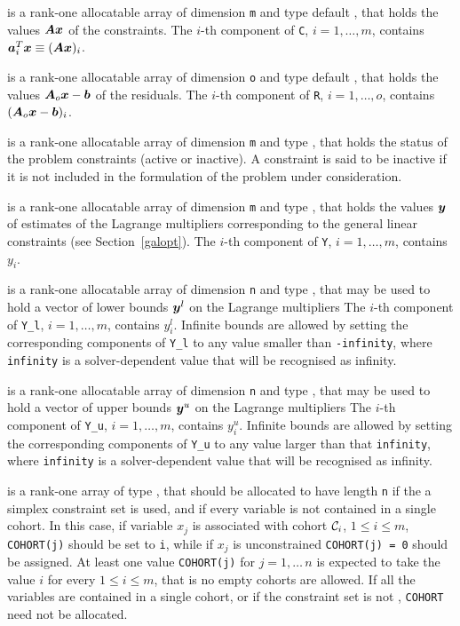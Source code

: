 \documentclass{galahad}
\begin{document}
\begin{description}
 is a rank-one allocatable array of dimension {\tt m} and type default
\realdp, that holds the values ${\bm{A}} {\bm{x}}$ of the constraints.
The $i$-th component of {\tt C}, $i = 1,  \ldots ,  m$, contains
${\bm{a}}_{i}^{T}{\bm{x}} \equiv ({\bm{A}} {\bm{x}})_{i}$.

 is a rank-one allocatable array of dimension {\tt o} and type default
\realdp, that holds the values ${\bm{A}}_o {\bm{x}} - {\bm{b}}$ of the residuals.
The $i$-th component of {\tt R}, $i = 1,  \ldots ,  o$, contains
$({\bm{A}}_o {\bm{x}} - {\bm{b}})_{i}$.

 is a rank-one allocatable array of dimension {\tt m} and type
\integer, that holds the status of the problem constraints (active or
inactive). A constraint is said to be inactive if it is not included in the
formulation of the problem under consideration.

 is a rank-one allocatable array of dimension {\tt m} and type
\realdp, that holds
the values ${\bm{y}}$ of estimates  of the Lagrange multipliers
corresponding to the general linear constraints (see Section~\ref{galopt}).
The $i$-th component of {\tt Y}, $i = 1,  \ldots ,  m$, contains $y_{i}$.

 is a rank-one allocatable array of dimension {\tt n} and type
\realdp, that may be used to hold
a vector of lower bounds ${\bm{y}}^{l}$ on the Lagrange multipliers
The $i$-th component of {\tt Y\_l}, $i = 1, \ldots , m$,
contains $y_{i}^{l}$.
Infinite bounds are allowed by setting the corresponding
components of {\tt Y\_l} to any value smaller than {\tt -infinity},
where {\tt infinity} is a  solver-dependent value that will be recognised as
infinity.

 is a rank-one allocatable array of dimension {\tt n} and type
\realdp, that may be used to hold
a vector of upper bounds ${\bm{y}}^{u}$ on the Lagrange multipliers
The $i$-th component of {\tt Y\_u}, $i = 1, \ldots , m$,
contains $y_{i}^{u}$.
Infinite bounds are allowed by setting the corresponding
components of {\tt Y\_u} to any value larger than that {\tt infinity},
where {\tt infinity} is a  solver-dependent value that will be recognised as
infinity.

 is a rank-one array of type \integer, that should
 be allocated to have length {\tt n} if the a simplex constraint set 
 is used, and if every variable is not contained in a single
cohort. In this case, if variable $x_j$ is associated with cohort $\calC_i$, 
$1 \leq i \leq m$, {\tt COHORT(j)} should be set to {\tt i}, while 
if $x_j$ is unconstrained {\tt COHORT(j) = 0} should be assigned. 
At least one value {\tt COHORT(j)} for $j = 1,\ldots\,n$ is expected to 
take the value $i$ for every $1 \leq i \leq m$, that is no empty cohorts 
are allowed. If all the variables are contained in a single cohort, 
or if the constraint set is not , {\tt COHORT} need not be allocated.


\end{description}
\end{document}
